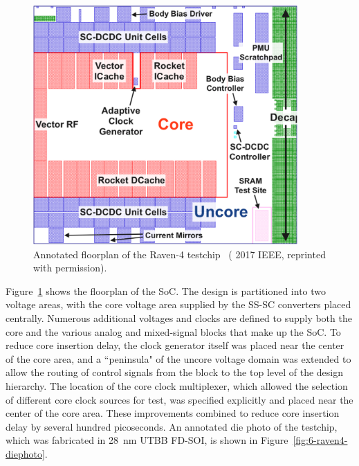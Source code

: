 \documentclass[graybox]{svmult}
\begin{document}
\begin{figure}
  \centering
  \includegraphics[width=0.9\textwidth]{6-raven4-floorplan}
  \caption{Annotated floorplan of the Raven-4 testchip~\cite{Keller2017} ({\textcopyright} 2017 IEEE, reprinted with permission).}
  \label{fig:6-raven4-floorplan}
\end{figure}

Figure~\ref{fig:6-raven4-floorplan} shows the floorplan of the SoC.
The design is partitioned into two voltage areas, with the core voltage area supplied by the SS-SC converters placed centrally.
Numerous additional voltages and clocks are defined to supply both the core and the various analog and mixed-signal blocks that make up the SoC.
To reduce core insertion delay, the clock generator itself was placed near the center of the core area, and a ``peninsula" of the uncore voltage domain was extended to allow the routing of control signals from the block to the top level of the design hierarchy.
The location of the core clock multiplexer, which allowed the selection of different core clock sources for test, was specified explicitly and placed near the center of the core area.
These improvements combined to reduce core insertion delay by several hundred picoseconds.
An annotated die photo of the testchip, which was fabricated in \SI{28}{\nano\meter} UTBB FD-SOI, is shown in Figure~\ref{fig:6-raven4-diephoto}.
\end{document}
